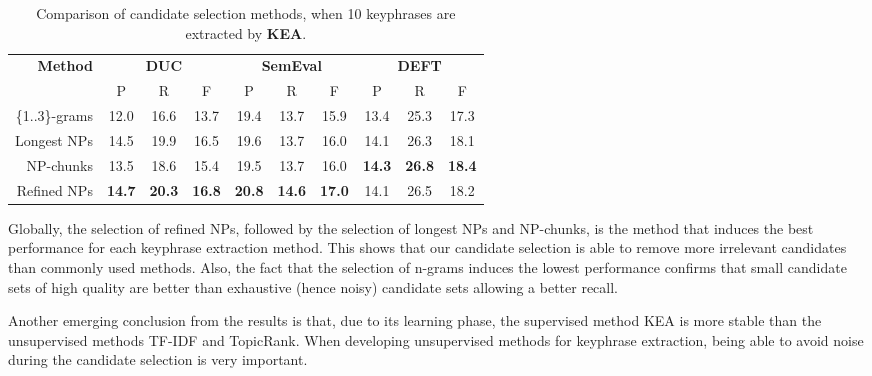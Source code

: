       \begin{table}
        \centering
        \begin{tabular}{rccccccccc}
          \toprule
          \multirow{2}{*}[-2pt]{\textbf{Method}} & \multicolumn{3}{c}{\textbf{DUC}} & \multicolumn{3}{c}{\textbf{SemEval}} & \multicolumn{3}{c}{\textbf{DEFT}}\\
          \cmidrule(r){2-4}\cmidrule(lr){5-7}\cmidrule(l){8-10}
          & P & R & F & P & R & F & P & R & F\\
          \midrule
          \{1..3\}-grams & 12.0 & 16.6 & 13.7 & 19.4 & 13.7 & 15.9 & 13.4 & 25.3 & 17.3\\
          Longest NPs & 14.5 & 19.9 & 16.5 & 19.6 & 13.7 & 16.0 & 14.1 & 26.3 & 18.1\\
          NP-chunks & 13.5 & 18.6 & 15.4 & 19.5 & 13.7 & 16.0 & \textbf{14.3} & \textbf{26.8} & \textbf{18.4}\\
          Refined NPs & \textbf{14.7} & \textbf{20.3} & \textbf{16.8} &
         \textbf{20.8} & \textbf{14.6} & \textbf{17.0} & 14.1 & 26.5 & 18.2\\
          \bottomrule
        \end{tabular}
        \caption{Comparison of candidate selection methods, when 10 keyphrases
                 are extracted by \textbf{KEA}.
                 \label{tab:kea_results}}
      \end{table}
      
      Globally, the selection of refined NPs, followed by the selection of
      longest NPs and NP-chunks, is the method that induces the best performance
      for each keyphrase extraction method. This shows that our candidate
      selection is able to remove more irrelevant candidates than commonly used
      methods. Also, the fact that the selection of n-grams induces the lowest
      performance confirms that small candidate sets of high quality are better
      than exhaustive (hence noisy) candidate sets allowing a better recall.
      
      Another emerging conclusion from the results is that, due to its
      learning phase, the supervised method KEA is more stable than the
      unsupervised methods TF-IDF and TopicRank. When developing unsupervised
      methods for keyphrase extraction, being able to avoid noise during the
      candidate selection is very important.

